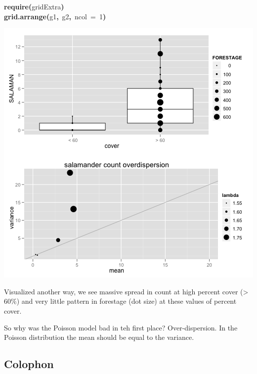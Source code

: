 \documentclass{article}
\makeatletter
\newcommand{\hlnumber}[1]{\textcolor[rgb]{0,0,0}{#1}}%
\newcommand{\hlfunctioncall}[1]{\textcolor[rgb]{.5,0,.33}{\textbf{#1}}}%
\newcommand{\hlkeyword}[1]{\textbf{#1}}%
\newcommand{\hlargument}[1]{\textcolor[rgb]{.69,.25,.02}{#1}}%
\newcommand{\hlsymbol}[1]{#1}%
\newcommand{\hlstd}[1]{\textcolor[rgb]{0,0,0}{#1}}%
\newenvironment{kframe}{%
 \def\FrameCommand##1{\hskip\@totalleftmargin \hskip-\fboxsep
 \colorbox{shadecolor}{##1}\hskip-\fboxsep
     \hskip-\linewidth \hskip-\@totalleftmargin \hskip\columnwidth}%
 \MakeFramed {\advance\hsize-\width
   \@totalleftmargin\z@ \linewidth\hsize
   \@setminipage}}%
 {\par\unskip\endMakeFramed}
\newenvironment{knitrout}{}{} %
\makeatother
\begin{document}
\begin{knitrout}
{\begin{kframe}
\begin{flushleft}
\hlstd{}\hlfunctioncall{require}\hlkeyword{(}\hlsymbol{gridExtra}\hlkeyword{)}\hspace*{\fill}\\
\hlstd{}\hlfunctioncall{grid.arrange}\hlkeyword{(}\hlsymbol{g1}\hlkeyword{,}{\ }\hlsymbol{g2}\hlkeyword{,}{\ }\hlargument{ncol}{\ }\hlargument{=}{\ }\hlnumber{1}\hlkeyword{)}\mbox{}
\normalfont
\end{flushleft}
\includegraphics{cor-issue} \end{kframe}}
\end{knitrout}


Visualized another way, we see massive spread in count at high percent cover (> 60\%) and very little pattern in forestage (dot size) at these values of percent cover.


So why was the Poisson model bad in teh first place? 
Over-dispersion. 
In the Poisson distribution the mean should be equal to the variance. 


\subsection*{Colophon}
\end{document}
